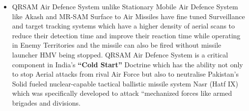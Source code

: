 \documentclass[12pt]{article} %
\begin{document}
\begin{itemize}
\item[] QRSAM Air Defence System unlike Stationary Mobile Air Defence System like Akash and MR-SAM Surface to Air Missiles have fine tuned Surveillance and target tracking systems which have a higher density of aerial scans to reduce their detection time and improve their reaction time while operating in Enemy Territories and the missile can also be fired without missile launcher HMV being stopped. QRSAM Air Defence System is a critical component in India’s \textbf{“Cold Start”} Doctrine which has the ability not only to stop Aerial attacks from rival Air Force but also to neutralise Pakistan’s Solid fueled nuclear-capable tactical ballistic missile system Nasr (Hatf IX) which was specifically developed to attack “mechanized forces like armed brigades and divisions.
\end{itemize}
\end{document}
